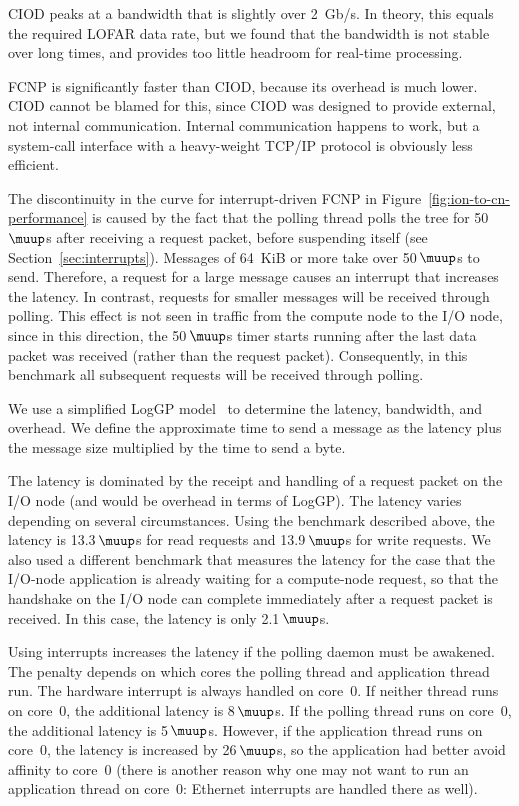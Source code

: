 \documentclass[conference]{worldcomp}
\newcommand{\us}{\,$\muup$s\xspace}
\begin{document}
CIOD peaks at a bandwidth that is slightly over 2~Gb/s.
In theory, this equals the required LOFAR data rate, but we found that the
bandwidth is not stable over long times, and provides too little
headroom for real-time processing.

FCNP is significantly faster than CIOD, because its overhead is much lower.
CIOD cannot be blamed for this, since CIOD was designed to provide external,
not internal communication.
Internal communication happens to work, but a system-call interface with a
heavy-weight TCP/IP protocol is obviously less efficient.

The discontinuity in the curve for interrupt-driven FCNP in
Figure~\ref{fig:ion-to-cn-performance} is caused by the fact that the polling
thread polls the tree for 50\us after receiving a request packet, before
suspending itself (see Section~\ref{sec:interrupts}).
Messages of 64~KiB or more take over 50\us to send.
Therefore, a request for a large message causes an interrupt that increases the
latency.
In contrast, requests for smaller messages will be received through polling.
This effect is not seen in traffic from the compute node to the I/O node,
since in this direction, the 50\us timer starts running after the last
data packet was received (rather than the request packet).
Consequently, in this benchmark all subsequent requests will be received
through polling.

We use a simplified LogGP model~\cite{Alexandrov:95} to determine the
latency, bandwidth, and overhead.
We define the approximate time to send a message as the latency plus the
message size multiplied by the time to send a byte.

The latency is dominated by the receipt and handling of a request packet on the
I/O node (and would be overhead in terms of LogGP).
The latency varies depending on several circumstances.
Using the benchmark described above, the latency is 13.3\us for read
requests and 13.9\us for write requests.
We also used a different benchmark that measures the latency for the case
that the I/O-node application is already waiting for a compute-node request,
so that the handshake on the I/O node can complete immediately after a request
packet is received.
In this case, the latency is only 2.1\us.

Using interrupts increases the latency if the polling daemon must be
awakened.
The penalty depends on which cores the polling thread and application thread
run.
The hardware interrupt is always handled on core~0.
If neither thread runs on core~0, the additional latency is 8\us.
If the polling thread runs on core~0, the additional latency is 5\us.
However, if the application thread runs on core~0, the latency is increased
by 26\us, so the application had better avoid affinity to core~0
(there is another reason why one may not want to run an application thread on
core~0: Ethernet interrupts are handled there as well).
\end{document}
